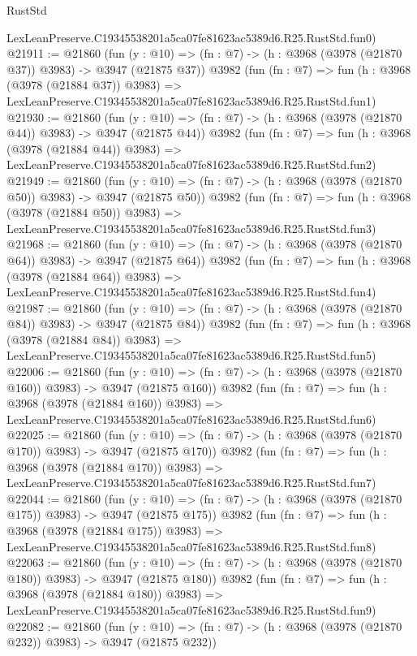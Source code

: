 \begin{lexlean}{RustStd}
\begin{coremodule}
    LexLeanPreserve.C19345538201a5ca07fe81623ac5389d6.R25.RustStd.fun0)
@21911 := @21860
    (fun (y : @10) => (fn : @7) -> (h : @3968 (@3978 (@21870 @37)) @3983) -> @3947 (@21875 @37))
    @3982
    (fun (fn : @7) =>
    fun (h : @3968 (@3978 (@21884 @37)) @3983) =>
    LexLeanPreserve.C19345538201a5ca07fe81623ac5389d6.R25.RustStd.fun1)
@21930 := @21860
    (fun (y : @10) => (fn : @7) -> (h : @3968 (@3978 (@21870 @44)) @3983) -> @3947 (@21875 @44))
    @3982
    (fun (fn : @7) =>
    fun (h : @3968 (@3978 (@21884 @44)) @3983) =>
    LexLeanPreserve.C19345538201a5ca07fe81623ac5389d6.R25.RustStd.fun2)
@21949 := @21860
    (fun (y : @10) => (fn : @7) -> (h : @3968 (@3978 (@21870 @50)) @3983) -> @3947 (@21875 @50))
    @3982
    (fun (fn : @7) =>
    fun (h : @3968 (@3978 (@21884 @50)) @3983) =>
    LexLeanPreserve.C19345538201a5ca07fe81623ac5389d6.R25.RustStd.fun3)
@21968 := @21860
    (fun (y : @10) => (fn : @7) -> (h : @3968 (@3978 (@21870 @64)) @3983) -> @3947 (@21875 @64))
    @3982
    (fun (fn : @7) =>
    fun (h : @3968 (@3978 (@21884 @64)) @3983) =>
    LexLeanPreserve.C19345538201a5ca07fe81623ac5389d6.R25.RustStd.fun4)
@21987 := @21860
    (fun (y : @10) => (fn : @7) -> (h : @3968 (@3978 (@21870 @84)) @3983) -> @3947 (@21875 @84))
    @3982
    (fun (fn : @7) =>
    fun (h : @3968 (@3978 (@21884 @84)) @3983) =>
    LexLeanPreserve.C19345538201a5ca07fe81623ac5389d6.R25.RustStd.fun5)
@22006 := @21860
    (fun (y : @10) => (fn : @7) -> (h : @3968 (@3978 (@21870 @160)) @3983) -> @3947 (@21875 @160))
    @3982
    (fun (fn : @7) =>
    fun (h : @3968 (@3978 (@21884 @160)) @3983) =>
    LexLeanPreserve.C19345538201a5ca07fe81623ac5389d6.R25.RustStd.fun6)
@22025 := @21860
    (fun (y : @10) => (fn : @7) -> (h : @3968 (@3978 (@21870 @170)) @3983) -> @3947 (@21875 @170))
    @3982
    (fun (fn : @7) =>
    fun (h : @3968 (@3978 (@21884 @170)) @3983) =>
    LexLeanPreserve.C19345538201a5ca07fe81623ac5389d6.R25.RustStd.fun7)
@22044 := @21860
    (fun (y : @10) => (fn : @7) -> (h : @3968 (@3978 (@21870 @175)) @3983) -> @3947 (@21875 @175))
    @3982
    (fun (fn : @7) =>
    fun (h : @3968 (@3978 (@21884 @175)) @3983) =>
    LexLeanPreserve.C19345538201a5ca07fe81623ac5389d6.R25.RustStd.fun8)
@22063 := @21860
    (fun (y : @10) => (fn : @7) -> (h : @3968 (@3978 (@21870 @180)) @3983) -> @3947 (@21875 @180))
    @3982
    (fun (fn : @7) =>
    fun (h : @3968 (@3978 (@21884 @180)) @3983) =>
    LexLeanPreserve.C19345538201a5ca07fe81623ac5389d6.R25.RustStd.fun9)
@22082 := @21860
    (fun (y : @10) => (fn : @7) -> (h : @3968 (@3978 (@21870 @232)) @3983) -> @3947 (@21875 @232))

\end{coremodule}
\end{lexlean}
